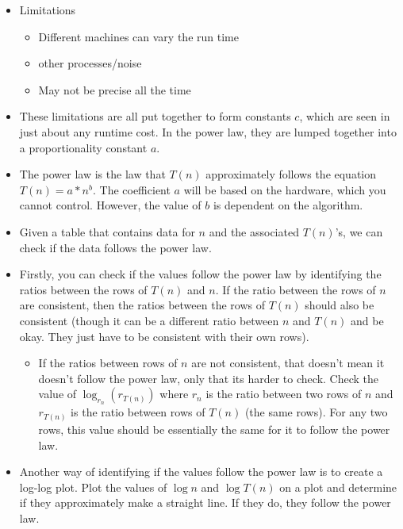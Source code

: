 \documentclass{article}
\begin{document}
\begin{itemize}
    \item Limitations
        \begin{itemize}
            \item Different machines can vary the run time 
            \item other processes/noise
            \item May not be precise all the time 
        \end{itemize}
    \item These limitations are all put together to form constants $c$, which are seen in just about any runtime cost. In the power law, they are lumped together into a proportionality constant $a$.
    \item The power law is the law that $T(n)$ approximately follows the equation $T(n) = a * n^b$. The coefficient $a$ will be based on the hardware, which you cannot control. However, the value of $b$ is dependent on the algorithm.
    \item Given a table that contains data for $n$ and the associated $T(n)$'s, we can check if the data  follows the power law.
    \item Firstly, you can check if the values follow the power law by identifying the ratios between the rows of $T(n)$ and $n$. If the ratio between the rows of $n$ are consistent, then the ratios between the rows of $T(n)$ should also be consistent (though it can be a different ratio between $n$ and $T(n)$ and be okay. They just have to be consistent with their own rows).
        \begin{itemize}
            \item If the ratios between rows of $n$ are not consistent, that doesn't mean it doesn't follow the power law, only that its harder to check. Check the value of $\log_{r_n} (r_{T(n)})$ where $r_n$ is the ratio between two rows of $n$ and $r_{T(n)}$ is the ratio between rows of $T(n)$ (the same rows). For any two rows, this value should be essentially the same for it to follow the power law.
        \end{itemize}
    \item
        Another way of identifying if the values follow the power law is to create a log-log plot. Plot the values of $\log n$ and $\log T(n)$ on a plot and determine if they approximately make a straight line. If they do, they follow the power law.
        \begin{tikzpicture}[domain=0:3]

\end{tikzpicture}
\end{itemize}
\end{document}

